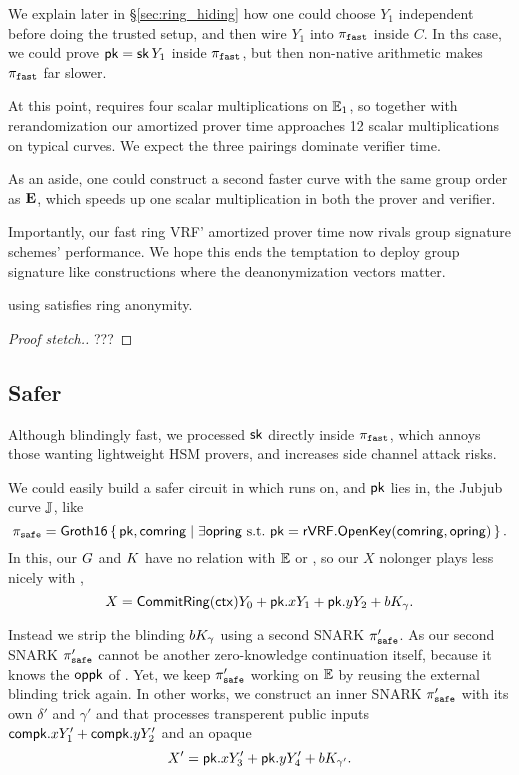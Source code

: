 We explain later in \S\ref{sec:ring_hiding} how one could
choose $Y_1$ independent before doing the trusted setup,
 and then wire $Y_1$ into $\pi_{\mathtt{fast}}$ inside $C$.
In ths case, we could prove $\mathsf{pk} = \mathsf{sk}\, Y_1$ inside $\pi_{\mathtt{fast}}$, but then
non-native arithmetic makes $\pi_{\mathtt{fast}}$ far slower.

At this point, \PedVRF requires four scalar multiplications on ${\mathbb{E}}_1$,
so together with rerandomization our amortized prover time
 approaches 12 scalar multiplications on typical curves. 
We expect the three pairings dominate verifier time.

As an aside, one could construct a second faster curve with the same
group order as ${\mathbf{E}}$, which speeds up one scalar multiplication
 in both the prover and verifier. 

Importantly, our fast ring VRF' amortized prover time now rivals
group signature schemes' performance.  We hope this ends the temptation
to deploy group signature like constructions where the deanonymization vectors matter.

\begin{proposition}\label{prop:pifast_anonymity}
\rVRF using \pifast satisfies ring anonymity.
\end{proposition}

\begin{proof}[Proof stetch.]
???
\end{proof}

\subsection{Safer}

Although blindingly fast, we processed $\mathsf{sk}$ directly inside $\pi_{\mathtt{fast}}$,
which annoys those wanting lightweight HSM provers, and
increases side channel attack risks.

We could easily build a safer circuit in which
\PedVRF runs on, and $\mathsf{pk}$ lies in, the Jubjub curve ${\mathbb{J}}$, like 
$$ \pisafe = \rrSNARK \Setst{ \pk, \comring }{
 \exists \openring \textrm{\ s.t.\ }
 \pk = \rVRF.\OpenKey(\comring,\openring)
} \mathperiod $$
In this, our $G$ and $K$ have no relation with ${\mathbb{E}}$ or \pisafe,
so our $X$ nolonger plays less nicely with \PedVRF, 
$$ X = {\mathsf{CommitRing}}(\mathsf{ctx}) Y_0 + \mathsf{pk}.x Y_1 + \mathsf{pk}.y Y_2 + b K_\gamma . $$

Instead we strip the blinding $b K_\gamma$ using a second SNARK $\pi_{\mathtt{safe}}'$.
As our second SNARK $\pi_{\mathtt{safe}}'$ cannot be another zero-knowledge continuation
itself, because it knows the $\mathsf{oppk}$ of \PedVRF.
Yet, we keep $\pi_{\mathtt{safe}}'$ working on ${\mathbb{E}}$ by reusing the external blinding
trick again.  In other works, we construct an inner SNARK $\pi_{\mathtt{safe}}'$ with
its own $\delta'$ and $\gamma'$ and that processes
 transperent public inputs $\mathsf{compk}.x Y'_1 + \mathsf{compk}.y Y'_2$ and an opaque
$$ X' = \mathsf{pk}.x Y'_3 + \mathsf{pk}.y Y'_4 + b K_{\gamma'} . $$

